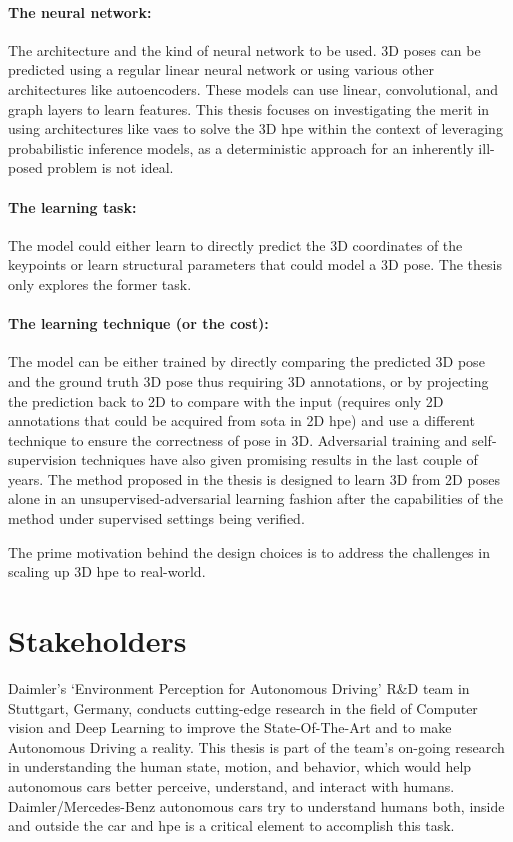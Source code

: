 \paragraph{The neural network:} The architecture and the kind of neural network to be used. 3D poses can be predicted using a regular linear neural network or using various other architectures like autoencoders. These models can use linear, convolutional, and graph layers to learn features. This thesis focuses on investigating the merit in using architectures like \acp{vae} to solve the 3D \ac{hpe} within the context of leveraging probabilistic inference models, as a deterministic approach for an inherently ill-posed problem is not ideal.

\paragraph{The learning task:} The model could either learn to directly predict the 3D coordinates of the keypoints or learn structural parameters that could model a 3D pose. The thesis only explores the former task.

\paragraph{The learning technique (or the cost):} The model can be either trained by directly comparing the predicted 3D pose and the ground truth 3D pose thus requiring 3D annotations, or by projecting the prediction back to 2D to compare with the input (requires only 2D annotations that could be acquired from \ac{sota} in 2D \ac{hpe}) and use a different technique to ensure the correctness of pose in 3D. Adversarial training and self-supervision techniques have also given promising results in the last couple of years. The method proposed in the thesis is designed to learn 3D from 2D poses alone in an unsupervised-adversarial learning fashion after the capabilities of the method under supervised settings being verified.

The prime motivation behind the design choices is to address the challenges in scaling up 3D \ac{hpe} to real-world.

\section{Stakeholders}
\label{sec:stakeholders}
Daimler’s ‘Environment Perception for Autonomous Driving’ R\&D team in Stuttgart, Germany, conducts cutting-edge research in the field of Computer vision and Deep Learning to improve the State-Of-The-Art and to make Autonomous Driving a reality. This thesis is part of the team’s on-going research in understanding the human state, motion, and behavior, which would help autonomous cars better perceive, understand, and interact with humans. Daimler/Mercedes-Benz autonomous cars try to understand humans both, inside and outside the car and \ac{hpe} is a critical element to accomplish this task.

